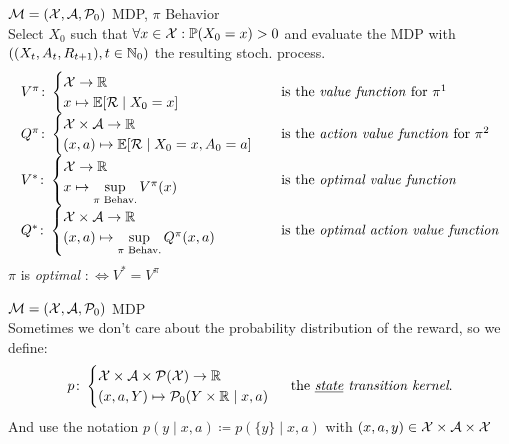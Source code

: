 \begin{definition}\(\mathcal{M}=(\mathcal{X},\mathcal{A},\mathcal{P}_0)\) MDP, \(\pi\) Behavior\\
Select \(X_0\) such that \(\forall x\in\mathcal{X}:\mathbb{P}(X_0=x)>0\) and evaluate the MDP with
\(((X_t,A_t,R_{t+1}), t\in \mathbb{N}_0)\) the resulting stoch. process.\\
\def\arraystretch{3}
\[
\begin{array}{l l}
	V^\pi\colon
	\begin{cases}
		\cX\to\R\\
		x\mapsto \E[\cR\mid X_0=x]
	\end{cases} 
	& \text{is the \emph{value function} for } \pi \footnotemark\\
	Q^\pi\colon
	\begin{cases}
		\cX\times\cA\to\R\\
		(x,a)\mapsto \E[\cR\mid X_0=x, A_0=a]
	\end{cases}
	& \text{is the \emph{action value function} for } \pi \footnotemark\\
	V^*\colon
	\begin{cases}
		\cX\to\R\\
		x\mapsto \sup\limits_{\pi\text{ Behav.}} V^\pi(x)
	\end{cases} 
	& \text{is the \emph{optimal value function}}\\
	Q^*\colon
	\begin{cases}
		\cX\times\cA\to\R\\
		(x,a)\mapsto \sup\limits_{\pi\text{ Behav.}} Q^\pi(x,a)
	\end{cases}
	& \text{is the \emph{optimal action value function}}
\end{array}
\]
\(\pi\) is \emph{optimal} \(:\iff V^*=V^\pi\)
\end{definition}
\begin{definition}\(\mathcal{M}=(\mathcal{X},\mathcal{A},\mathcal{P}_0)\) MDP\\
Sometimes we don't care about the probability distribution of the reward, so we define:
	\[
	p\colon 
	\begin{cases}
		\mathcal{X}\times\mathcal{A}\times\mathcal{P}(\mathcal{X})\to\mathbb{R}\\
		(x,a,Y)\mapsto \mathcal{P}_0(Y\times\mathbb{R}\mid x,a)
	\end{cases}\text{ the \emph{\underline{state} transition kernel}.}
	\] 
And use the notation \(p(y\mid x,a)\coloneqq p(\{y\}\mid x,a)\) with \((x,a,y)\in\mathcal{X}\times\mathcal{A}\times\mathcal{X}\)
	
\end{definition}
